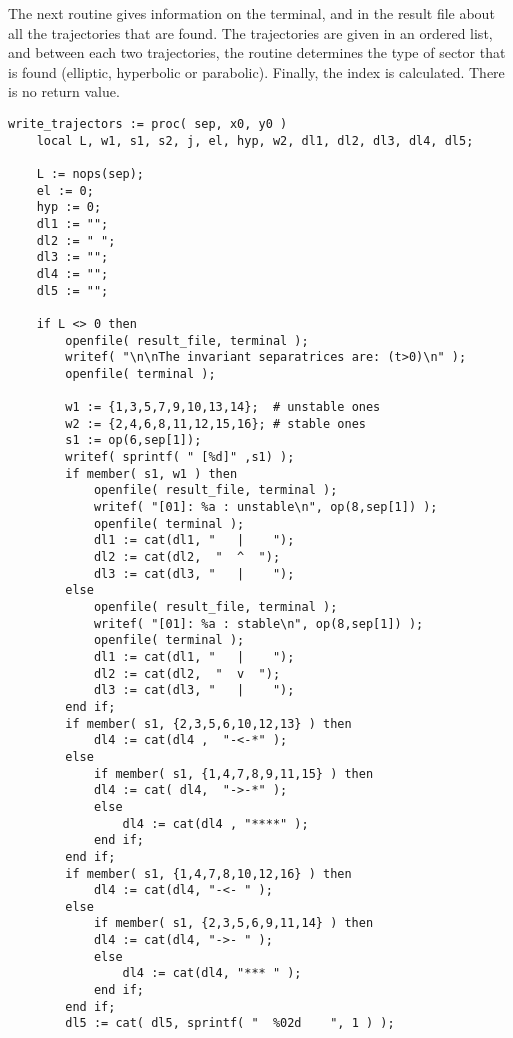\documentclass[a4paper,10pt]{article}
\begin{document}
The next routine gives information on the terminal, and in the result file about
all the trajectories that are found.  The trajectories are given in an ordered
list, and between each two trajectories, the routine determines the type of sector
that is found (elliptic, hyperbolic or parabolic).  Finally, the index is calculated.
There is no return value.

\begin{lstlisting}[name=blowup]
write_trajectors := proc( sep, x0, y0 )
    local L, w1, s1, s2, j, el, hyp, w2, dl1, dl2, dl3, dl4, dl5;

    L := nops(sep);
    el := 0;
    hyp := 0;
    dl1 := "";
    dl2 := " ";
    dl3 := "";
    dl4 := "";
    dl5 := "";

    if L <> 0 then
        openfile( result_file, terminal );
        writef( "\n\nThe invariant separatrices are: (t>0)\n" );
        openfile( terminal );

        w1 := {1,3,5,7,9,10,13,14};  # unstable ones
        w2 := {2,4,6,8,11,12,15,16}; # stable ones
        s1 := op(6,sep[1]);
        writef( sprintf( " [%d]" ,s1) );
        if member( s1, w1 ) then
            openfile( result_file, terminal );
            writef( "[01]: %a : unstable\n", op(8,sep[1]) );
            openfile( terminal );
            dl1 := cat(dl1, "   |    ");
            dl2 := cat(dl2,  "  ^  ");
            dl3 := cat(dl3, "   |    ");
        else
            openfile( result_file, terminal );
            writef( "[01]: %a : stable\n", op(8,sep[1]) );
            openfile( terminal );
            dl1 := cat(dl1, "   |    ");
            dl2 := cat(dl2,  "  v  ");
            dl3 := cat(dl3, "   |    ");
        end if;
        if member( s1, {2,3,5,6,10,12,13} ) then
            dl4 := cat(dl4 ,  "-<-*" );
        else
            if member( s1, {1,4,7,8,9,11,15} ) then
            dl4 := cat( dl4,  "->-*" );
            else
                dl4 := cat(dl4 , "****" );
            end if;
        end if;
        if member( s1, {1,4,7,8,10,12,16} ) then
            dl4 := cat(dl4, "-<- " );
        else
            if member( s1, {2,3,5,6,9,11,14} ) then
            dl4 := cat(dl4, "->- " );
            else
                dl4 := cat(dl4, "*** " );
            end if;
        end if;
        dl5 := cat( dl5, sprintf( "  %02d    ", 1 ) );


\end{lstlisting}
\end{document}
